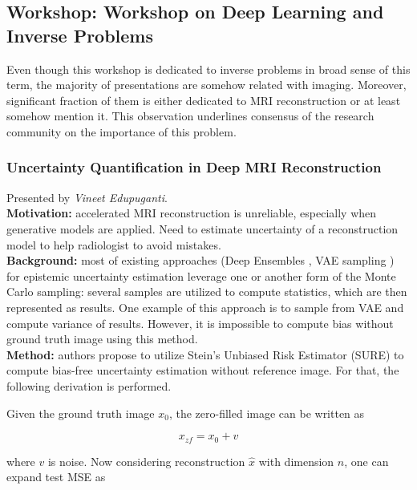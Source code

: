 \subsection{Workshop: Workshop on Deep Learning and Inverse Problems}

Even though this workshop is dedicated to inverse problems in broad sense of this term, the majority of presentations are somehow related with imaging. 
Moreover, significant fraction of them is either dedicated to MRI reconstruction or at least somehow mention it. 
This observation underlines consensus of the research community on the importance of this problem.

\subsubsection{Uncertainty Quantification in Deep MRI
Reconstruction \cite{edupuganti2020uncertainty}}

Presented by \textit{Vineet Edupuganti}. \\

{\bf Motivation:} accelerated MRI reconstruction is unreliable, especially when generative models are applied. Need to estimate uncertainty of a reconstruction model to help radiologist to avoid mistakes. \\

{\bf Background:} most of existing approaches (Deep Ensembles \cite{Lakshminarayanan17}, VAE sampling \cite{corr/abs-2007-08128}) for epistemic uncertainty estimation leverage one or another form of the Monte Carlo sampling: several samples are utilized to compute statistics, which are then represented as results. One example of this approach is to sample from VAE and compute variance of results. However, it is impossible to compute bias without ground truth image using this method. \\

{\bf Method:} authors propose to utilize  Stein’s Unbiased Risk Estimator
(SURE) \cite{doi:10.1080/01621459.2018.1429276} to compute bias-free uncertainty estimation without reference image. For that, the following derivation is performed.

Given the ground truth image $x_0$, the zero-filled image can
be written as 

\begin{equation}
    x_{zf} = x_0 + v
\end{equation} 

where $v$ is noise. Now considering reconstruction $\hat{x}$ with
dimension $n$, one can expand test MSE as 

